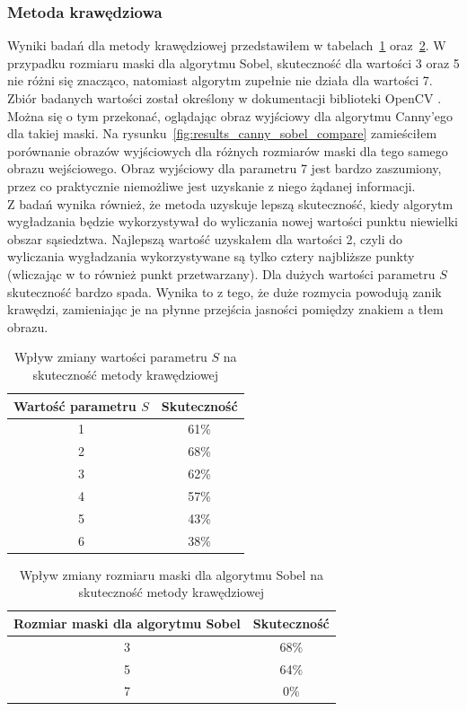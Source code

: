 \subsubsection{Metoda krawędziowa}
Wyniki badań dla metody krawędziowej przedstawiłem w tabelach~\ref{tab:metoda_krawedziowa_param_s} oraz~\ref{tab:metoda_krawedziowa_sobel}. W przypadku rozmiaru maski dla algorytmu Sobel, skuteczność dla wartości 3 oraz 5 nie różni się znacząco, natomiast algorytm zupełnie nie działa dla wartości 7. Zbiór badanych wartości został określony w dokumentacji biblioteki OpenCV \cite{opencv}. Można się o tym przekonać, oglądając obraz wyjściowy dla algorytmu Canny'ego dla takiej maski. Na rysunku~\ref{fig:results_canny_sobel_compare} zamieściłem porównanie obrazów wyjściowych dla różnych rozmiarów maski dla tego samego obrazu wejściowego. Obraz wyjściowy dla parametru 7 jest bardzo zaszumiony, przez co praktycznie niemożliwe jest uzyskanie z niego żądanej informacji. \\
Z badań wynika również, że metoda uzyskuje lepszą skuteczność, kiedy algorytm wygładzania będzie wykorzystywał do wyliczania nowej wartości punktu niewielki obszar sąsiedztwa. Najlepszą wartość uzyskałem dla wartości 2, czyli do wyliczania wygładzania wykorzystywane są tylko cztery najbliższe punkty (wliczając w to również punkt przetwarzany). Dla dużych wartości parametru $S$ skuteczność bardzo spada. Wynika to z tego, że duże rozmycia powodują zanik krawędzi, zamieniając je na płynne przejścia jasności pomiędzy znakiem a tłem obrazu.
\begin {table}
  \begin{center}
    \begin{tabular}{c | c}
      Wartość parametru $S$ & Skuteczność \\
      \hline
      1 & 61\% \\
      2 & 68\% \\
      3 & 62\% \\
      4 & 57\% \\
      5 & 43\% \\
      6 & 38\% 
    \end{tabular}
    \caption {Wpływ zmiany wartości parametru $S$ na skuteczność metody krawędziowej}
    \label{tab:metoda_krawedziowa_param_s} 
  \end{center}
\end {table}

\begin {table}
  \begin{center}
    \begin{tabular}{c | c}
      Rozmiar maski dla algorytmu Sobel & Skuteczność \\
      \hline
      3 & 68\% \\
      5 & 64\% \\
      7 & 0\% 
    \end{tabular}
    \caption {Wpływ zmiany rozmiaru maski dla algorytmu Sobel na skuteczność metody krawędziowej}
    \label{tab:metoda_krawedziowa_sobel} 
  \end{center}
\end {table}

